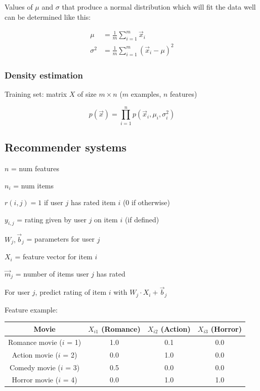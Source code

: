 \documentclass[12pt]{article}
\begin{document}
Values of $\mu$ and $\sigma$ that produce a normal distribution which will fit the data well can be determined
like this:

\begin{align*}
    \mu &= \frac{1}{m} \sum_{i=1}^m \vec{x}_i\\
    \sigma^2 &= \frac{1}{m} \sum_{i=1}^m (\vec{x}_i - \mu)^2
\end{align*}

\subsubsection{Density estimation}

Training set: matrix $X$ of size $m \times n$ ($m$ examples, $n$ features)

\[ p(\vec{x}) = \prod_{i=1}^n p(\vec{x}_i,\mu_i,\sigma_i^2) \]

\subsection{Recommender systems}

$n$ = num features

$n_i$ = num items

$r(i,j) = 1$ if user $j$ has rated item $i$ (0 if otherwise)

$y_{i,j}$ = rating given by user $j$ on item $i$ (if defined)

$W_j,\vec{b}_j$ = parameters for user $j$

$X_i$ = feature vector for item $i$

$\vec{m}_j$ = number of items user $j$ has rated

For user $j$, predict rating of item $i$ with $W_j \cdot X_i + \vec{b}_j$

Feature example:

\begin{center}
    \begin{tabular}{ ||c|c|c|c|| }
        \hline
        Movie & $X_{i1}$ (Romance) & $X_{i2}$ (Action) & $X_{i3}$ (Horror)\\
        \hline
        Romance movie ($i$ = 1) & 1.0 & 0.1 & 0.0\\
        Action movie ($i$ = 2) & 0.0 & 1.0 & 0.0\\
        Comedy movie ($i$ = 3) & 0.5 & 0.0 & 0.0\\
        Horror movie ($i$ = 4) & 0.0 & 1.0 & 1.0\\
        \hline
    \end{tabular}
\end{center}
\end{document}
